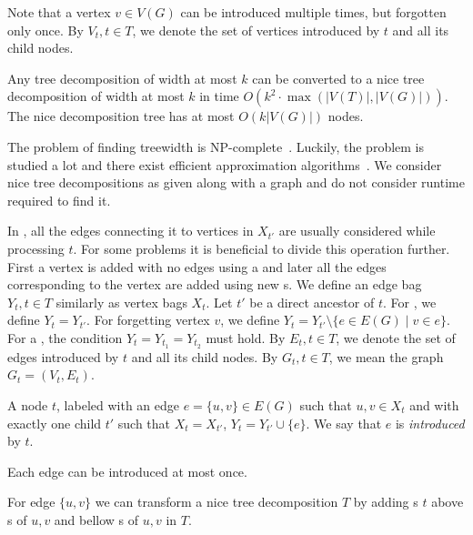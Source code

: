 Note that a vertex \( v \in V(G) \) can be introduced multiple times,
but forgotten only once.
By \( V_t, t \in T \), we denote the set of vertices introduced by \( t \)
and all its child nodes.

\begin{lemma}
	Any tree decomposition of width at most \( k \) can be converted to
	a nice tree decomposition of width at most \( k \)
	in time \( O(k^2 \cdot \max(|V(T)|, |V(G)|)) \).
	The nice decomposition tree has at most \( O(k|V(G)|) \) nodes.
\end{lemma}

The problem of finding treewidth is NP-complete~\cite{tree_width_np_complete}.
Luckily, the problem is studied a lot and
there exist efficient approximation algorithms~\cite{tree_width_approximation}.
We consider nice tree decompositions as given along with a graph
and do not consider runtime required to find it.

In \IntroduceVertexNode{}, all the edges connecting it
to vertices in \( X_{t'} \) are usually considered while processing \( t \).
%
For some problems it is beneficial to divide this operation further.
First a vertex is added with no edges using a \IntroduceVertexNode{}
and later all the edges corresponding to the vertex are added using new \IntroduceEdgeNode{}s.
We define an edge bag \( Y_t, t \in T \) similarly as vertex bags \( X_t \).
%
%
Let \( t' \) be a direct ancestor of \( t \).
For \IntroduceVertexNode{}, we define \( Y_t = Y_{t'} \).
For \ForgetVertexNode{} forgetting vertex \( v \),
we define \( Y_t = Y_{t'} \setminus \{ e \in E(G) \mid v \in e\} \).
For a \JoinNode{}, the condition \( Y_t = Y_{t_1} = Y_{t_2} \) must hold.
%
By \( E_t, t \in T \), we denote the set of edges introduced by \( t \)
and all its child nodes.
By \( G_t, t \in T \), we mean the graph \( G_t = (V_t, E_t) \).
%
\begin{definition}
	A node \( t \), labeled with an edge \( e = \{u, v\} \in E(G) \)
	such that \( u, v \in X_t \) and with exactly one child \( t' \)
	such that \( X_t = X_{t'} \), \( Y_t = Y_{t'} \cup \{e\} \).
	We say that \( e \) is \emph{introduced} by \( t \).
\end{definition}
%
Each edge can be introduced at most once.

For edge \( \{u, v\} \) we can transform a nice tree decomposition \( T \)
by adding \IntroduceEdgeNode{}s \( t \) above \IntroduceVertexNode{}s of \( u, v \)
and bellow \ForgetVertexNode{}s of \( u, v \) in \( T \).

